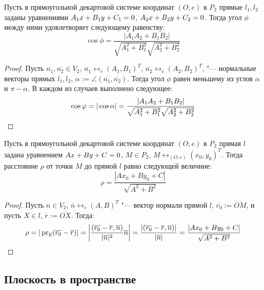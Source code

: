 \begin{proposition}
	Пусть в прямоугольной декартовой системе координат $(O, e)$ в $P_2$ прямые $l_1, l_2$ заданы  уравнениями $A_1x\hm{+}B_1y+C_1=0$, $A_2x\hm{+}B_2y\hm{+}C_2=0$. Тогда угол $\phi$ между ними удовлетворяет следующему равенству:
	\[\cos{\phi} = \frac{|A_1A_2+B_1B_2|}{\sqrt{A_1^2+B_1^2}\sqrt{A_2^2+B_2^2}}\]
\end{proposition}

\begin{proof}
	Пусть $\overline{n_1}, \overline{n_2} \in V_2$, $\overline{n_1} \leftrightarrow_{e} (A_1, B_1)^T$, $\overline{n_2} \leftrightarrow_{e} (A_2, B_2)^T$, "--- нормальные векторы прямых $l_1, l_2$, $\alpha := \angle(\overline{n_1}, \overline{n_2})$. Тогда угол $\phi$ равен меньшему из углов $\alpha$ и $\pi - \alpha$. В каждом из случаев выполнено следующее:
	\[\cos{\phi} = |\cos{\alpha}| = \frac{|A_1A_2+B_1B_2|}{\sqrt{A_1^2+B_1^2}\sqrt{A_2^2+B_2^2}}\qedhere\]
\end{proof}

\begin{proposition}
	Пусть в прямоугольной декартовой системе координат $(O, e)$ в $P_2$ прямая $l$ задана  уравнением $Ax\hm{+}By+C=0$, $M \in P_2$, $M \leftrightarrow_{(O, e)} (x_0, y_0)^T$. Тогда расстояние $\rho$ от точки $M$ до прямой $l$ равно следующей величине:
	\[\rho = \frac{|Ax_0 + By_0 + C|}{\sqrt{A^2 + B^2}}\]
\end{proposition}

\begin{proof}
	Пусть $\overline{n} \in V_2$, $\overline n \leftrightarrow_{e} (A, B)^T$ "--- вектор нормали прямой $l$, $\overline{r_0} := \overline{OM}$, и пусть $X \in l$, $\overline{r} := \overline{OX}$. Тогда:
	\[\rho = |\pr_{\overline{n}}(\overline{r_0} - \overline{r})|
	=
	\left|\frac{(\overline{r_0} - \overline{r}, \overline{n})}{|\overline{n}|^2}\overline{n}\right|
	=
	\frac{|(\overline{r_0} - \overline{r}, \overline{n})|}{|\overline{n}|}
	=
	\frac{|Ax_0 + By_0 + C|}{\sqrt{A^2 + B^2}}\qedhere\]
\end{proof}

\subsection{Плоскость в пространстве}

